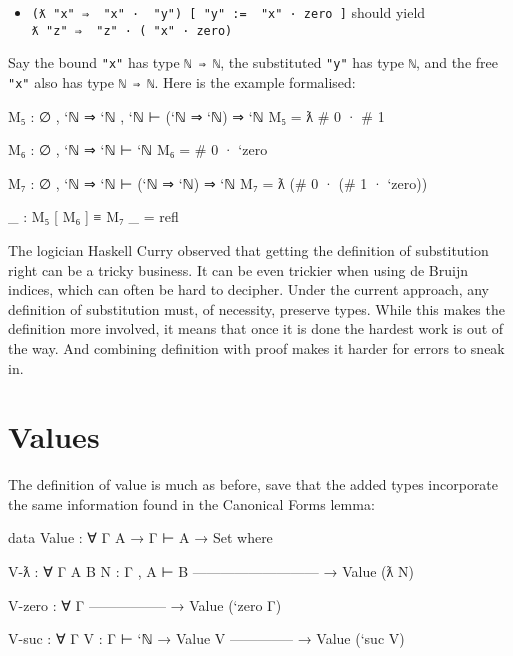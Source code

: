 \begin{itemize}
\tightlist
\item
  \texttt{(ƛ\ "x"\ ⇒\ \textasciigrave{}\ "x"\ ·\ \textasciigrave{}\ "y")\ {[}\ "y"\ :=\ \textasciigrave{}\ "x"\ ·\ \textasciigrave{}zero\ {]}}
  should yield
  \texttt{ƛ\ "z"\ ⇒\ \textasciigrave{}\ "z"\ ·\ (\textasciigrave{}\ "x"\ ·\ \textasciigrave{}zero)}
\end{itemize}

Say the bound \texttt{"x"} has type
\texttt{\textasciigrave{}ℕ\ ⇒\ \textasciigrave{}ℕ}, the substituted
\texttt{"y"} has type \texttt{\textasciigrave{}ℕ}, and the free
\texttt{"x"} also has type
\texttt{\textasciigrave{}ℕ\ ⇒\ \textasciigrave{}ℕ}. Here is the example
formalised:

\begin{fence}
\begin{code}
M₅ : ∅ , `ℕ ⇒ `ℕ , `ℕ ⊢ (`ℕ ⇒ `ℕ) ⇒ `ℕ
M₅ = ƛ # 0 · # 1

M₆ : ∅ , `ℕ ⇒ `ℕ ⊢ `ℕ
M₆ = # 0 · `zero

M₇ : ∅ , `ℕ ⇒ `ℕ ⊢ (`ℕ ⇒ `ℕ) ⇒ `ℕ
M₇ = ƛ (# 0 · (# 1 · `zero))

_ : M₅ [ M₆ ] ≡ M₇
_ = refl
\end{code}
\end{fence}

The logician Haskell Curry observed that getting the definition of
substitution right can be a tricky business. It can be even trickier
when using de Bruijn indices, which can often be hard to decipher. Under
the current approach, any definition of substitution must, of necessity,
preserve types. While this makes the definition more involved, it means
that once it is done the hardest work is out of the way. And combining
definition with proof makes it harder for errors to sneak in.

\hypertarget{values}{%
\section{Values}\label{values}}

The definition of value is much as before, save that the added types
incorporate the same information found in the Canonical Forms lemma:

\begin{fence}
\begin{code}
data Value : ∀ {Γ A} → Γ ⊢ A → Set where

  V-ƛ : ∀ {Γ A B} {N : Γ , A ⊢ B}
      ---------------------------
    → Value (ƛ N)

  V-zero : ∀ {Γ}
      -----------------
    → Value (`zero {Γ})

  V-suc : ∀ {Γ} {V : Γ ⊢ `ℕ}
    → Value V
      --------------
    → Value (`suc V)
\end{code}
\end{fence}

